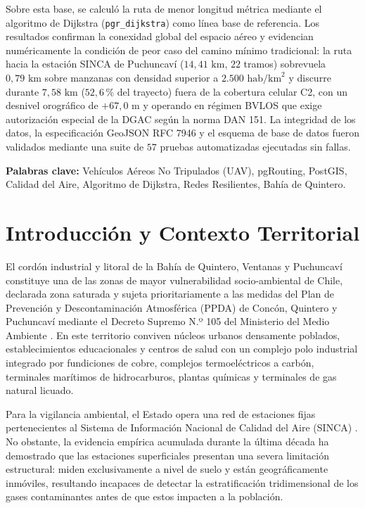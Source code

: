 \documentclass[letterpaper,12pt]{article}
\begin{document}
Sobre esta base, se calculó la ruta de menor longitud métrica mediante el algoritmo de Dijkstra (\texttt{pgr\_dijkstra}) como línea base de referencia. Los resultados confirman la conexidad global del espacio aéreo y evidencian numéricamente la condición de peor caso del camino mínimo tradicional: la ruta hacia la estación SINCA de Puchuncaví ($14{,}41\text{ km}$, $22$ tramos) sobrevuela $0{,}79\text{ km}$ sobre manzanas con densidad superior a $2.500\text{ hab/km}^2$ y discurre durante $7{,}58\text{ km}$ ($52{,}6$\,\% del trayecto) fuera de la cobertura celular C2, con un desnivel orográfico de $+67{,}0\text{ m}$ y operando en régimen BVLOS que exige autorización especial de la DGAC según la norma DAN 151. La integridad de los datos, la especificación GeoJSON RFC 7946 y el esquema de base de datos fueron validados mediante una suite de $57$ pruebas automatizadas ejecutadas sin fallas.

\vspace{0.5cm}
\noindent \textbf{Palabras clave:} Vehículos Aéreos No Tripulados (UAV), pgRouting, PostGIS, Calidad del Aire, Algoritmo de Dijkstra, Redes Resilientes, Bahía de Quintero.

\newpage
\tableofcontents
\newpage

\section{Introducción y Contexto Territorial}
\label{sec:introduccion}

El cordón industrial y litoral de la Bahía de Quintero, Ventanas y Puchuncaví constituye una de las zonas de mayor vulnerabilidad socio-ambiental de Chile, declarada zona saturada y sujeta prioritariamente a las medidas del Plan de Prevención y Descontaminación Atmosférica (PPDA) de Concón, Quintero y Puchuncaví mediante el Decreto Supremo N.º 105 del Ministerio del Medio Ambiente \cite{ppda_concon}. En este territorio conviven núcleos urbanos densamente poblados, establecimientos educacionales y centros de salud con un complejo polo industrial integrado por fundiciones de cobre, complejos termoeléctricos a carbón, terminales marítimos de hidrocarburos, plantas químicas y terminales de gas natural licuado.

Para la vigilancia ambiental, el Estado opera una red de estaciones fijas pertenecientes al Sistema de Información Nacional de Calidad del Aire (SINCA) \cite{sinca}. No obstante, la evidencia empírica acumulada durante la última década ha demostrado que las estaciones superficiales presentan una severa limitación estructural: miden exclusivamente a nivel de suelo y están geográficamente inmóviles, resultando incapaces de detectar la estratificación tridimensional de los gases contaminantes antes de que estos impacten a la población.
\end{document}

